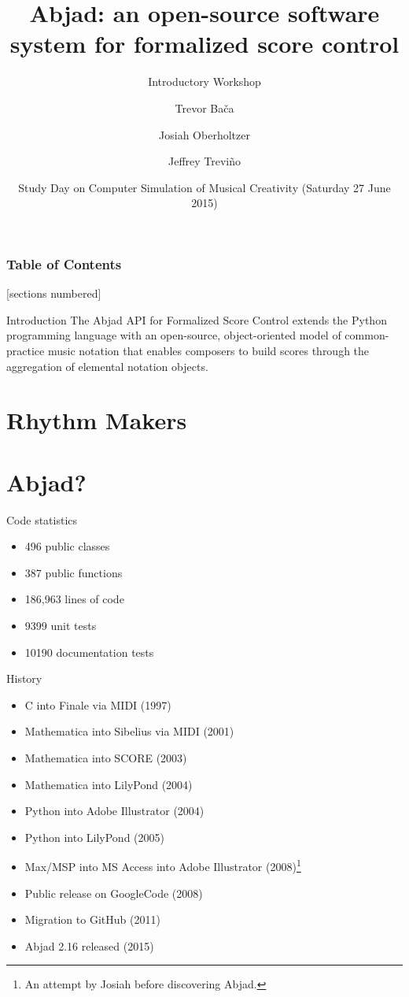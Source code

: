 \documentclass[10pt]{beamer}
\title[]{Abjad: 
    an open-source software system
    for formalized score control
}
\subtitle{Introductory Workshop}
\author{
    Trevor Ba\v{c}a \inst{1} \and 
    Josiah Oberholtzer \inst{1} \and 
    Jeffrey Trevi\~{n}o \inst{2}
}
\institute[shortinst]{
    \inst{1}Department of Music, Harvard University \and 
    \inst{2} Department of Music, Colorado College
}
\date[CFP 2003]{
    Study Day on Computer Simulation of Musical Creativity
    (Saturday 27 June 2015)
}
\begin{document}
\maketitle

\begin{frame}
    \frametitle{Table of Contents}
    [sections numbered]
    \tableofcontents[hideallsubsections]
\end{frame}

\begin{frame}{Introduction}
The Abjad API for Formalized Score Control extends the Python programming
language with an open-source, object-oriented model of common-practice music
notation that enables composers to build scores through the aggregation of
elemental notation objects.
\end{frame}

\section{Rhythm Makers}

\section{Abjad?}

\begin{frame}{Code statistics}
    \begin{itemize}
        \item 496 public classes
        \item 387 public functions
        \item 186,963 lines of code
        \item 9399 unit tests
        \item 10190 documentation tests
    \end{itemize}
\end{frame}

\begin{frame}{History}
    \begin{itemize}
        \item C into Finale via MIDI (1997)
        \item Mathematica into Sibelius via MIDI (2001)
        \item Mathematica into SCORE (2003)
        \item Mathematica into LilyPond (2004)
        \item Python into Adobe Illustrator (2004)
        \item Python into LilyPond (2005)
        \item Max/MSP into MS Access into Adobe Illustrator (2008)\footnote{
            An attempt by Josiah before discovering Abjad.
            } 
        \item Public release on GoogleCode (2008)
        \item Migration to GitHub (2011)
        \item Abjad 2.16 released (2015)
    \end{itemize}
\end{frame}
\end{document}
